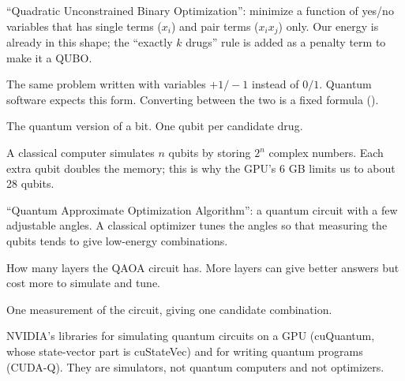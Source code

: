 \begin{description}[leftmargin=0.4cm,style=nextline]
\item[QUBO] ``Quadratic Unconstrained Binary Optimization'': minimize a function of yes/no variables that has single terms ($x_i$) and pair terms ($x_ix_j$) only. Our energy is already in this shape; the ``exactly $k$ drugs'' rule is added as a penalty term to make it a QUBO.
\item[Ising model] The same problem written with variables $+1/-1$ instead of $0/1$. Quantum software expects this form. Converting between the two is a fixed formula ().
\item[Qubit] The quantum version of a bit. One qubit per candidate drug.
\item[State vector] A classical computer simulates $n$ qubits by storing $2^n$ complex numbers. Each extra qubit doubles the memory; this is why the GPU's 6 GB limits us to about 28 qubits.
\item[QAOA] ``Quantum Approximate Optimization Algorithm'': a quantum circuit with a few adjustable angles. A classical optimizer tunes the angles so that measuring the qubits tends to give low-energy combinations.
\item[Depth $p$] How many layers the QAOA circuit has. More layers can give better answers but cost more to simulate and tune.
\item[Shot] One measurement of the circuit, giving one candidate combination.
\item[cuQuantum / cuStateVec / CUDA-Q] NVIDIA's libraries for simulating quantum circuits on a GPU (cuQuantum, whose state-vector part is cuStateVec) and for writing quantum programs (CUDA-Q). They are simulators, not quantum computers and not optimizers.
\end{description}
